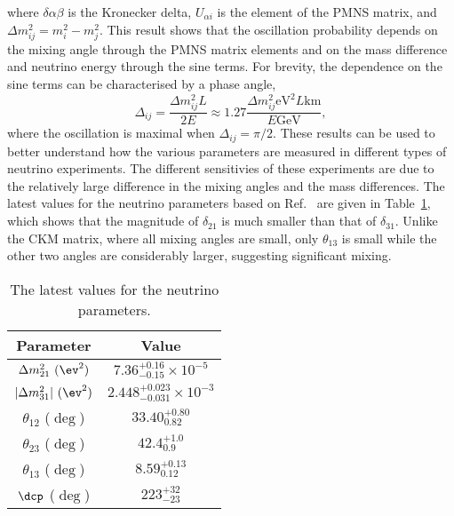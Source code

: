 where $\delta{\alpha\beta}$ is the Kronecker delta, $U_{\alpha i}$ is the element of the PMNS matrix, and $\Delta m^2_{ij} = m_i^2 - m_j^2$.
This result shows that the oscillation probability depends on the mixing angle through the PMNS matrix elements and on the mass difference and neutrino energy through the sine terms.
For brevity, the dependence on the sine terms can be characterised by a phase angle,
\begin{equation}
  \label{eq:osc-phase}
  \Delta_{ij} = \frac{\Delta m^2_{ij} L}{2E} \approx 1.27 \frac{\Delta m^2_{ij} \text{eV}^2 L \text{km}}{E \text{GeV}},
\end{equation}
where the oscillation is maximal when $\Delta_{ij} = \pi / 2$.
These results can be used to better understand how the various parameters are measured in different types of neutrino experiments.
The different sensitivies of these experiments are due to the relatively large difference in the mixing angles and the mass differences.
The latest values for the neutrino parameters based on Ref.~\cite{Capozzi:2021fjo,ParticleDataGroup:2024cfk} are given in Table~\ref{tab:neutrino-parameters}, which shows that the magnitude of $\delta_{21}$ is much smaller than that of $\delta_{31}$.
Unlike the CKM matrix, where all mixing angles are small, only $\theta_{13}$ is small while the other two angles are considerably larger, suggesting significant mixing.

\begin{table}[h]
  \centering
  \begin{tabular}{c|c}
    Parameter & Value \\
    \hline
    \hline
    $\Delta m^2_{21}~(\ev^2)$ & $7.36^{+0.16}_{-0.15} \times 10^{-5}$ \\
    $|\Delta m^2_{31}|~(\ev^2)$ & $2.448^{+0.023}_{-0.031} \times 10^{-3}$ \\
    $\theta_{12}$ ($\deg$) & $33.40^{+0.80}_{0.82}$ \\
    $\theta_{23}$ ($\deg$)       & $42.4^{+1.0}_{0.9}$ \\
    $\theta_{13}$ ($\deg$)       & $8.59^{+0.13}_{0.12}$ \\
    $\dcp$ ($\deg$) & $223^{+32}_{-23}$   \\
    \hline
  \end{tabular}
  \caption{The latest values for the neutrino parameters.}
  \label{tab:neutrino-parameters}
\end{table}



